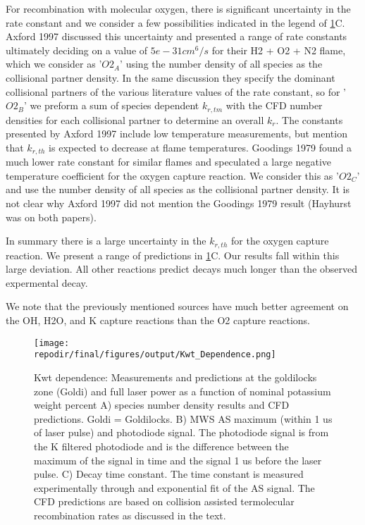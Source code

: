 For recombination with molecular oxygen, there is significant uncertainty in the rate constant and we consider a few possibilities indicated in the legend of \ref{fig:kwt_dependence}C. Axford 1997 discussed this uncertainty and presented a range of rate constants ultimately deciding on a value of $5e-31 cm^6/s$ for their H2 + O2 + N2 flame, which we consider as '$O2_A$' using the number density of all species as the collisional partner density. In the same discussion they specify the dominant collisional partners of the various literature values of the rate constant, so for '$O2_B$' we preform a sum of species dependent $k_{r,tm}$ with the CFD number densities for each collisional partner to determine an overall $k_r$. The constants presented by Axford 1997 include low temperature measurements, but mention that $k_{r,th}$ is expected to decrease at flame temperatures. Goodings 1979 found a much lower rate constant for similar flames and speculated a large negative temperature coefficient for the oxygen capture reaction. We consider this as '$O2_C$' and use the number density of all species as the collisional partner density. It is not clear why Axford 1997 did not mention the Goodings 1979 result (Hayhurst was on both papers). 

In summary there is a large uncertainty in the $k_{r,th}$ for the oxygen capture reaction. We present a range of predictions in \ref{fig:kwt_dependence}C. Our results fall within this large deviation. All other reactions predict decays much longer than the observed expermental decay. 

We note that the previously mentioned sources have much better agreement on the OH, H2O, and K capture reactions than the O2 capture reactions. 



\begin{figure}[h]
    \texttt{[image: \\repodir/final/figures/output/Kwt\_Dependence.png]} 
    \caption{Kwt dependence: Measurements and predictions at the goldilocks zone (Goldi) and full laser power as a function of nominal potassium weight percent A) species number density results and CFD predictions. Goldi = Goldilocks. B) MWS AS maximum (within 1 us of laser pulse) and photodiode signal. The photodiode signal is from the K filtered photodiode and is the difference between the maximum of the signal in time and the signal 1 us before the laser pulse. C) Decay time constant. The time constant is measured experimentally through and exponential fit of the AS signal. The CFD predictions are based on collision assisted termolecular recombination rates as discussed in the text. }
    \label{fig:kwt_dependence}
\end{figure}


